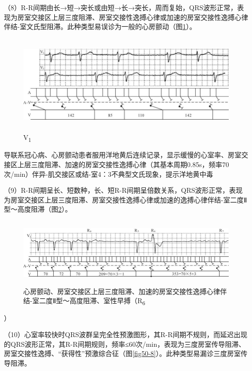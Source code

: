 （8）R-R间期由长→短→突长或由短→长→突长，周而复始，QRS波形正常，表现为房室交接区上层三度阻滞、房室交接性逸搏心律或加速的房室交接性逸搏心律伴结-室文氏型阻滞。此种类型易误诊为一般的心房颤动（图\ref{fig13-20}）。

\begin{figure}[!htbp]
 \centering
 \includegraphics[width=5.80208in,height=1.98958in]{./images/Image00228.jpg}
 \captionsetup{justification=centering}
 \caption{V\textsubscript{1}}
 \label{fig13-20}
  \end{figure} 
导联系冠心病、心房颤动患者服用洋地黄后连续记录，显示缓慢的心室率、房室交接区上层三度阻滞、加速的房室交接性逸搏心律（其基本周期0.85s，频率70次/min）伴异-肌交接区或结-室4：3不典型文氏现象，提示洋地黄中毒

（9）R-R间期呈长、短数种，长、短R-R间期呈倍数关系，QRS波形正常，表现为房室交接区上层三度阻滞、房室交接性逸搏心律或加速的逸搏心律伴结-室二度Ⅱ型～高度阻滞（图\ref{fig13-21}）。

\begin{figure}[!htbp]
 \centering
 \includegraphics[width=5.73958in,height=1.36458in]{./images/Image00229.jpg}
 \captionsetup{justification=centering}
 \caption{心房颤动、房室交接区上层三度阻滞、加速的房室交接性逸搏心律伴结-室二度Ⅱ型～高度阻滞、室性早搏（R\textsubscript{6}}
 \label{fig13-21}
  \end{figure} 
）

（10）心室率较快时QRS波群呈完全性预激图形，其R-R间期不规则，而延迟出现的QRS波形正常，其R-R间期规则，频率≤60次/min，表现为三度房室传导阻滞、房室交接性逸搏、“获得性”预激综合征（图\ref{fig50-8}）。此种类型易漏诊三度房室传导阻滞。

\protect\hypertarget{text00020.htmlux5cux23subid205}{}{}

